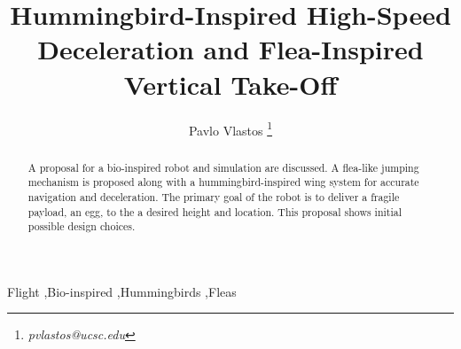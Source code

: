 \documentclass[preprint,authoryear,12pt] {elsarticle}
\begin{document}
\begin{frontmatter}

\title{Hummingbird-Inspired High-Speed Deceleration and Flea-Inspired Vertical Take-Off} 

\author{Pavlo Vlastos \footnote{\textit{pvlastos@ucsc.edu}}}

\address{Baskin School of Engineering, UC Santa Cruz}

\begin{abstract} 
A proposal for a bio-inspired robot and simulation are discussed. A flea-like jumping mechanism is proposed along with a hummingbird-inspired wing system for accurate navigation and deceleration. The primary goal of the robot is to deliver a fragile payload, an egg, to the a desired height and location. This proposal shows initial possible design choices.\\
\end{abstract}

\begin{keyword}
Flight \sep Bio-inspired \sep Hummingbirds \sep Fleas
\end{keyword}

\end{frontmatter}



 	
 		
 		
 	




\end{document}
